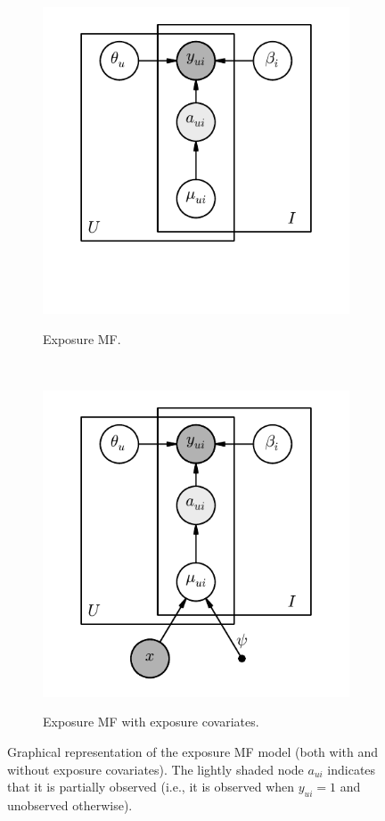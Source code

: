 \begin{figure}
  \centering
  \begin{subfigure}[t]{4in}
  \centering
  \includegraphics{fig/plate_diagram.pdf}
  \label{fig:plate_diagram}
  \caption{Exposure MF.}
  \end{subfigure}
  \\
  \begin{subfigure}[t]{4in}
  \centering
  \includegraphics{fig/plate_diagram_side_info.pdf}
  \label{fig:plate_diagram_side_info}
  \caption{Exposure MF with exposure covariates.}
  \end{subfigure}
  \caption{Graphical representation of the exposure MF model (both with and without exposure covariates). The lightly shaded node $a_{ui}$ indicates that it is partially observed (i.e., it is observed when $y_{ui} = 1$ and unobserved otherwise).}
\end{figure}

